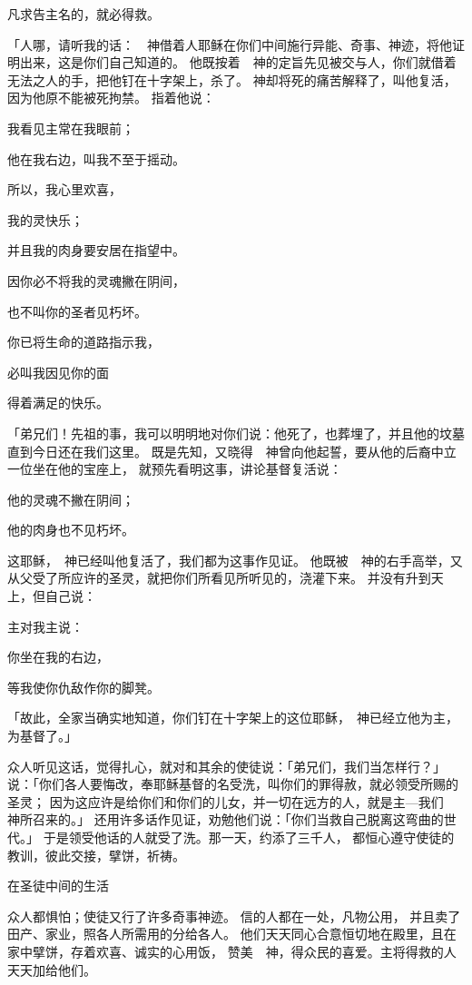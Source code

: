 {\par }{\Q 凡求告主名的，就必得救。
\par }{\PP {}「{}人哪，请听我的话：　神借着{}人耶稣在你们中间施行异能、奇事、神迹，将他证明出来，这是你们自己知道的。
他既按着　神的定旨先见被交与人，你们就借着无法之人的手，把他钉在十字架上，杀了。
神却将死的痛苦解释了，叫他复活，因为他原不能被死拘禁。
指着他说：
\par }{\Q 我看见主常在我眼前；
\par }{\Q 他在我右边，叫我不至于摇动。
\par }{\PP {}所以，我心里欢喜，
\par }{\Q 我的灵快乐；
\par }{\Q 并且我的肉身要安居在指望中。
\par }{\Q {}因你必不将我的灵魂撇在阴间，
\par }{\Q 也不叫你的圣者见朽坏。
\par }{\Q {}你已将生命的道路指示我，
\par }{\Q 必叫我因见你的面
\par }{\Q 得着满足的快乐。
\par }{\PP {}「弟兄们！先祖{}的事，我可以明明地对你们说：他死了，也葬埋了，并且他的坟墓直到今日还在我们这里。
既是先知，又晓得　神曾向他起誓，要从他的后裔中立一位坐在他的宝座上，
就预先看明这事，讲论基督复活说：
\par }{\Q 他的灵魂不撇在阴间；
\par }{\Q 他的肉身也不见朽坏。
\par }{\MM {}这耶稣，　神已经叫他复活了，我们都为这事作见证。
他既被　神的右手高举，又从父受了所应许的圣灵，就把你们所看见所听见的，浇灌下来。
并没有升到天上，但自己说：
\par }{\Q 主对我主说：
\par }{\Q 你坐在我的右边，
\par }{\PP {}等我使你仇敌作你的脚凳。
\par }{\PP {}「故此，{}全家当确实地知道，你们钉在十字架上的这位耶稣，　神已经立他为主，为基督了。」
\par }{\PP {}众人听见这话，觉得扎心，就对{}和其余的使徒说：「弟兄们，我们当怎样行？」
说：「你们各人要悔改，奉耶稣基督的名受洗，叫你们的罪得赦，就必领受所赐的圣灵；
因为这应许是给你们和你们的儿女，并一切在远方的人，就是主—我们　神所召来的。」
还用许多话作见证，劝勉他们说：「你们当救自己脱离这弯曲的世代。」
于是领受他话的人就受了洗。那一天，{}约添了三千人，
都恒心遵守使徒的教训，彼此交接，擘饼，祈祷。
\par }{\SH 在圣徒中间的生活
\par }{\PP {}众人都惧怕；使徒又行了许多奇事神迹。
信的人都在一处，凡物公用，
并且卖了田产、家业，照各人所需用的分给各人。
他们天天同心合意恒切地在殿里，且在家中擘饼，存着欢喜、诚实的心用饭，
赞美　神，得众民的喜爱。主将得救的人天天加给他们。

}
